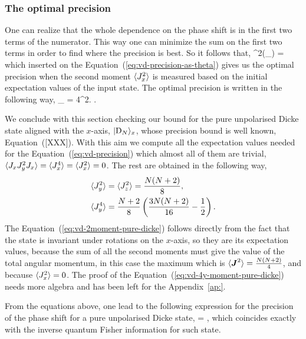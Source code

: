{\subsubsection{The optimal precision}
One can realize that the whole dependence on the phase shift is in the first two terms of the numerator.
This way one can minimize the sum on the first two terms in order to find where the precision is best.
So it follows that,
\be
  \tan^2(\theta_{}) = 
\ee
which inserted on the Equation~{(\ref{eq:vd-precision-as-theta})} gives us the optimal precision when the second moment $\langle J_x^2 \rangle$ is measured based on the initial expectation values of the input state. The optimal precision is written in the following way,
\be
  \varian{\theta}_{} = 
  {4^2}.
  \label{eq:vd-precision}
\ee.

We conclude with this section checking our bound for the pure unpolarised Dicke state aligned with the $x$-axis, $\vert \text{D}_N \rangle_x$, whose precision bound is well known, Equation~{([XXX])}.
With this aim we compute all the expectation values needed for the Equation~{(\ref{eq:vd-precision})} which almost all of them are trivial, $\langle J_xJ_y^2J_x \rangle=\langle J_x^4 \rangle=\langle J_x^2 \rangle=0$.
The rest are obtained in the following way,
\begin{align}
  \langle J_y^2 \rangle & = \langle J_z^2 \rangle = \frac{N (N+2)}{8},
  \label{eq:vd-2moment-pure-dicke}\\
  \langle J_y^4 \rangle & = \frac{N+2}{8}\left(\frac{3N(N+2)}{16}-\frac{1}{2}\right).
  \label{eq:vd-4y-moment-pure-dicke}
\end{align}
The Equation~{(\ref{eq:vd-2moment-pure-dicke})} follows directly from the fact that the state is invariant under rotations on the $x$-axis, so they are its expectation values, because the sum of all the second moments must give the value of the total angular momentum, in this case the maximum which is $\langle \boldsymbol{J}^2 \rangle = \frac{N (N+2)}{4}$, and because $\langle J_x^2 \rangle=0$.
The proof of the Equation~{(\ref{eq:vd-4y-moment-pure-dicke})} needs more algebra and has been left for the Appendix~{\ref{ap:}}.

From the equations above, one lead to the following expression for the precision of the phase shift for a pure unpolarised Dicke state,
\be
  \varian{\theta} = ,
\ee
which coincides exactly with the inverse quantum Fisher information for such state.

}

